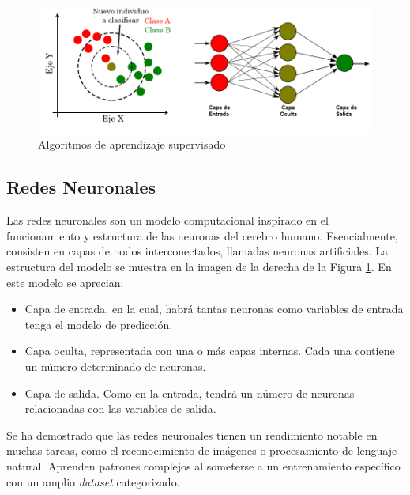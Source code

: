		
		
		\begin{figure}[!ht]
			\centering
			\includegraphics[width=\textwidth]{images/chapter_2/knn_redneu}
			\caption{Algoritmos de aprendizaje supervisado}
			\label{fig:aprendizaje_supervisado}
		\end{figure}

	\subsection{Redes Neuronales}

		Las redes neuronales son un modelo computacional inspirado en el funcionamiento y estructura de las neuronas del cerebro humano. Esencialmente, consisten en capas de nodos interconectados, llamadas neuronas artificiales. La estructura del modelo se muestra en la imagen de la derecha de la Figura \ref{fig:aprendizaje_supervisado}. En este modelo se aprecian:


		\begin{itemize}
			\item Capa de entrada, en la cual, habrá tantas neuronas como variables de entrada tenga el modelo de predicción.
			\vspace{-0.4cm} 
			\item Capa oculta, representada con una o más capas internas. Cada una contiene un número determinado de neuronas.
			\vspace{-0.4cm}	
			\item Capa de salida. Como en la entrada, tendrá un número de neuronas relacionadas con las variables de salida.
		\end{itemize}
		
		\vspace{-0.2cm}
		
		Se ha demostrado que las redes neuronales tienen un rendimiento notable en muchas tareas, como el reconocimiento de imágenes o procesamiento de lenguaje natural. Aprenden patrones complejos al someterse a un entrenamiento específico con un amplio \textit{dataset} categorizado.	
		
